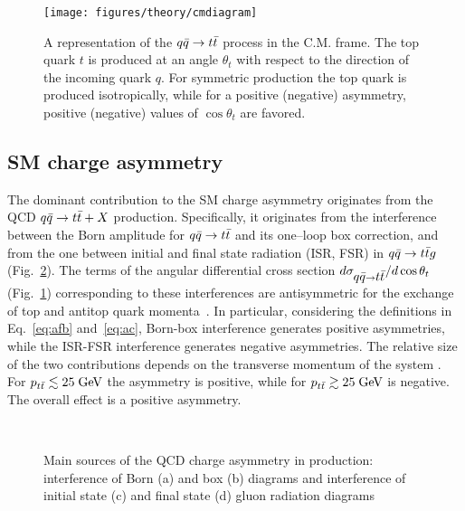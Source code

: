 \begin{figure}[!htb]\centering
  \texttt{[image: figures/theory/cmdiagram]}
  \caption{A representation of the $\mbox{$q\bar{q}$}{}\to\mbox{$t\bar{t}$}{}$ process in the
    C.M. frame. The top quark $t$ is produced at an angle $\theta_t$
    with respect to the direction of the incoming quark $q$. For
    symmetric production the top quark is produced isotropically,
    while for a positive (negative) asymmetry, positive (negative)
    values of $\cos\theta_t$ are favored. } 
  \label{fig:cmdiagram}
\end{figure}


\subsection{SM charge asymmetry}
\label{sec:smca}

The dominant contribution to the SM charge asymmetry originates from
the QCD $\mbox{$q\bar{q}$}{}\to\mbox{$t\bar{t}$}{}+X$ production. Specifically, it originates from the
interference between the Born amplitude for $\mbox{$q\bar{q}$}{}\to\mbox{$t\bar{t}$}{}$ and
its one--loop box correction, and from the one between initial and final
state radiation (ISR, FSR) in $\mbox{$q\bar{q}$}{}\to{}\mbox{$t\bar{t}$}{}g$
(Fig.~\ref{fig:asymdiagrams}). The terms of the angular differential cross section
$d\sigma_{\mbox{$q\bar{q}$}{}\to{}\mbox{$t\bar{t}$}{}}/d\cos\theta_t$ (Fig.~\ref{fig:cmdiagram})
corresponding to these interferences are antisymmetric for the
exchange of top and antitop quark momenta~\cite{Kuhn:1998kw}. In
particular, considering the definitions in Eq.~\ref{eq:afb}
and~\ref{eq:ac}, Born-box interference generates positive asymmetries,
while the ISR-FSR interference generates negative asymmetries.
The relative size of the two contributions depends on the transverse
momentum of the \ttbar{} system \pttt{}. For
$\mbox{$p_{t\bar{t}}$}{}\lesssim{}25\; \mathrm{GeV}{}$ the asymmetry is positive, while for
$\mbox{$p_{t\bar{t}}$}{}\gtrsim{}25\; \mathrm{GeV}{}$ is negative. The overall effect is a
positive asymmetry.
\begin{figure}[!htb]
  \centering
   \quad
   \\
   \quad
  \caption{Main sources of the QCD charge asymmetry in \ttbar{}
    production: interference of Born (a) and box (b) diagrams and
    interference of initial state (c) and final state (d) gluon
    radiation diagrams}
  \label{fig:asymdiagrams}
\end{figure}

